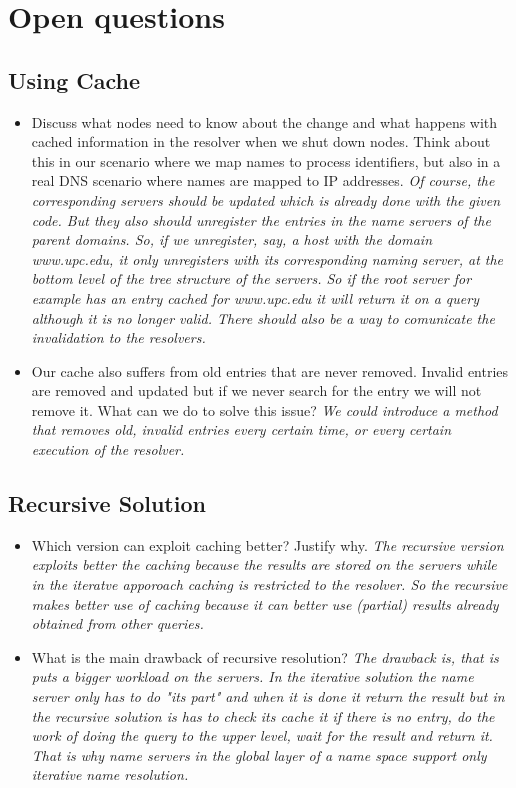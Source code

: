 \section{Open questions}

\subsection{Using Cache}
\begin{itemize}
\item Discuss what nodes need to know about the change and what happens with cached information in the resolver when we shut down nodes.
Think about this in our scenario where we map names to process identifiers, but
also in a real DNS scenario where names are mapped to IP addresses. 
\newline\textit{Of course, the corresponding servers should be updated which is  already done with the given code. But they also should unregister the entries in the name servers of the parent domains. So, if we unregister, say, a host with the domain www.upc.edu, it only unregisters with its corresponding naming server, at the bottom level of the tree structure of the servers. So if the root server for example has an entry cached for www.upc.edu it will return it on a query although it is no longer valid.
\newline There should also be a way to comunicate the invalidation to the resolvers.}
\item Our cache also suffers from old entries that are never removed. Invalid entries are removed and updated but if we never search for the entry we will not remove it. What can we do to solve this issue?
\newline\textit{We could introduce a method that removes old, invalid entries every certain time, or every certain execution of the resolver.}
\end{itemize}

\subsection{Recursive Solution}
\begin{itemize}
\item Which version can exploit caching better? Justify why. 
\newline\textit{The recursive version exploits better the caching because the results are stored on the servers while in the iteratve apporoach caching is restricted to the resolver. So the recursive makes better use of caching because it can better use (partial) results already obtained from other queries.}
\item What is the main drawback of recursive resolution?
\newline\textit{The drawback is, that is puts a bigger workload on the servers. In the iterative solution the name server only has to do "its part" and when it is done it return the result but in the recursive solution is has to check its cache it if there is no entry, do the work of doing the query to the upper level, wait for the result and return it.
\newline That is why name servers in the global layer of a name space support only iterative name resolution.
}
\end{itemize}